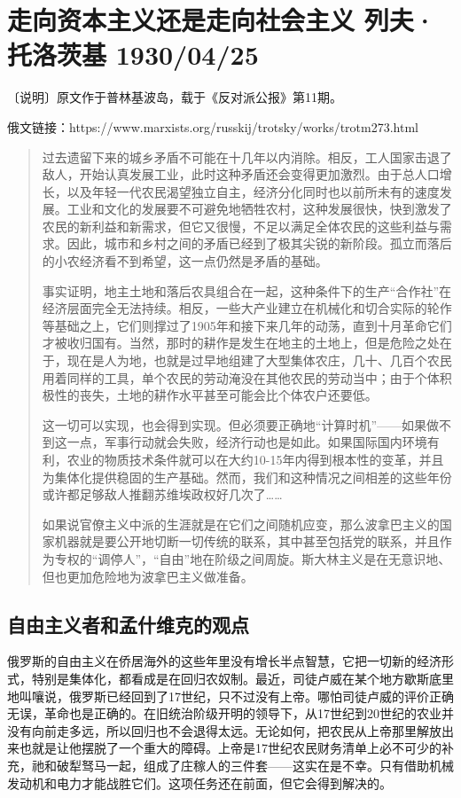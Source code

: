 \documentclass[UTF8, 12pt, a4paper]{ctexrep}
\begin{document}
\newpage

\chapter{走向资本主义还是走向社会主义 列夫·托洛茨基 1930/04/25}

〔说明〕原文作于普林基波岛，载于《反对派公报》第11期。

俄文链接：https://www.marxists.org/russkij/trotsky/works/trotm273.html

\begin{quotation}
    \small {
    过去遗留下来的城乡矛盾不可能在十几年以内消除。相反，工人国家击退了敌人，开始认真发展工业，此时这种矛盾还会变得更加激烈。由于总人口增长，以及年轻一代农民渴望独立自主，经济分化同时也以前所未有的速度发展。工业和文化的发展要不可避免地牺牲农村，这种发展很快，快到激发了农民的新利益和新需求，但它又很慢，不足以满足全体农民的这些利益与需求。因此，城市和乡村之间的矛盾已经到了极其尖锐的新阶段。孤立而落后的小农经济看不到希望，这一点仍然是矛盾的基础。

    事实证明，地主土地和落后农具组合在一起，这种条件下的生产“合作社”在经济层面完全无法持续。相反，一些大产业建立在机械化和切合实际的轮作等基础之上，它们则撑过了1905年和接下来几年的动荡，直到十月革命它们才被收归国有。当然，那时的耕作是发生在地主的土地上，但是危险之处在于，现在是人为地，也就是过早地组建了大型集体农庄，几十、几百个农民用着同样的工具，单个农民的劳动淹没在其他农民的劳动当中；由于个体积极性的丧失，土地的耕作水平甚至可能会比个体农户还要低。

    这一切可以实现，也会得到实现。但必须要正确地“计算时机”——如果做不到这一点，军事行动就会失败，经济行动也是如此。如果国际国内环境有利，农业的物质技术条件就可以在大约10-15年内得到根本性的变革，并且为集体化提供稳固的生产基础。然而，我们和这种情况之间相差的这些年份或许都足够敌人推翻苏维埃政权好几次了……

    如果说官僚主义中派的生涯就是在它们之间随机应变，那么波拿巴主义的国家机器就是要公开地切断一切传统的联系，其中甚至包括党的联系，并且作为专权的“调停人”，“自由”地在阶级之间周旋。斯大林主义是在无意识地、但也更加危险地为波拿巴主义做准备。
    }
\end{quotation}

\newpage

\section{自由主义者和孟什维克的观点}

俄罗斯的自由主义在侨居海外的这些年里没有增长半点智慧，它把一切新的经济形式，特别是集体化，都看成是在回归农奴制。最近，司徒卢威在某个地方歇斯底里地叫嚷说，俄罗斯已经回到了17世纪，只不过没有上帝。哪怕司徒卢威的评价正确无误，革命也是正确的。在旧统治阶级开明的领导下，从17世纪到20世纪的农业并没有向前走多远，所以回归也不会退得太远。无论如何，把农民从上帝那里解放出来也就是让他摆脱了一个重大的障碍。上帝是17世纪农民财务清单上必不可少的补充，祂和破犁驽马一起，组成了庄稼人的三件套——这实在是不幸。只有借助机械发动机和电力才能战胜它们。这项任务还在前面，但它会得到解决的。
\end{document}
